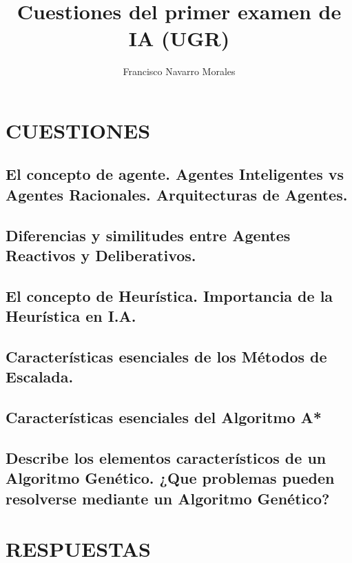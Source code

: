 \documentclass[a4paper, 11pt]{article}
\title{Cuestiones del primer examen de IA (UGR)}
\author{Francisco Navarro Morales}
\begin{document}
\maketitle


\pagebreak

\section{CUESTIONES}
\subsection{El concepto de agente. Agentes Inteligentes vs Agentes Racionales. Arquitecturas de Agentes.}
\subsection{Diferencias y similitudes entre Agentes Reactivos y Deliberativos.}
\subsection{El concepto de Heurística. Importancia de la Heurística en I.A.}
\subsection{Características esenciales de los Métodos de Escalada.}
\subsection{Características esenciales del Algoritmo A*}
\subsection{Describe los elementos característicos de un Algoritmo Genético. ¿Que problemas pueden resolverse mediante un Algoritmo Genético?}
\pagebreak
\section{RESPUESTAS}
\end{document}

